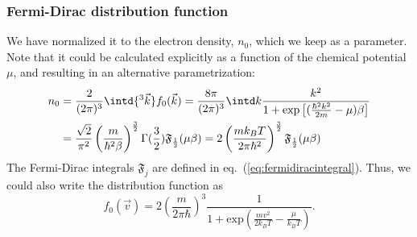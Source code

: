 \documentclass[physics,phd,nolot,nolof]{uccthesis}%
\begin{document}
\subsubsection{Fermi-Dirac distribution function}
We have normalized it to the electron density, $n_0$, which we keep as a parameter. 
Note that it could be calculated explicitly as a function of the chemical potential $\mu$, and resulting in an alternative parametrization:
\begin{equation}
  \begin{split}
    n_0	&=\frac{2}{(2\pi)^3}\intd{^3\vec k} f_0(\vec k) 
 	 =\frac{8\pi}{(2\pi)^3}\intd k \frac{k^2}{1+\exp\left[(\frac{\hbar^2 k^2}{2 m}-\mu)\beta\right]} \\	
	& = \frac{\sqrt 2}{\pi^2} \left(\frac{m}{\hbar^2\beta} \right)^\frac{3}{2} \Gamma(\frac{3}{2}) \mathfrak{F}_\frac{1}{2}(\mu\beta)
 	 =2 \left( \frac{m k_B T}{2\pi\hbar^2} \right)^\frac{3}{2}\mathfrak{F}_\frac{1}{2}(\mu\beta)
  \end{split}
  \label{eq:n0-explicit}
\end{equation}
The Fermi-Dirac integrals $\mathfrak{F}_j$ are defined in eq.~(\ref{eq:fermidiracintegral}).
Thus, we could also write the distribution function as 
\begin{equation}
  f_0(\vec v)%
=2\left(\frac{m}{2\pi\hbar}\right)^3
\frac{1}{1+\text{exp}(\frac{mv^2}{2k_BT}-\frac{\mu}{k_BT})}.
  \label{eq:Fermi-Dirac-distribution-alternativ}
\end{equation}
\end{document}
